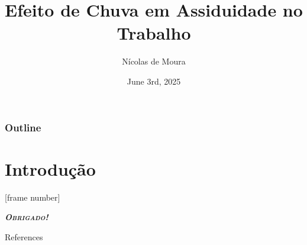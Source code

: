 \documentclass[compress,sans,12pt,aspectratio=169]{beamer}
\title{\textbf{Efeito de Chuva em Assiduidade no Trabalho}}
\date{June 3rd, 2025}
\author{Nícolas de Moura \inst{\textdagger}}
\institute{\inst{\textdagger} Escola de Economia de São Paulo - FGV/EESP}
\newcommand{\textdest}[1]{\textbf{\textit{\textsc{#1}}}}
\begin{document}
\frame[plain]{\titlepage}

    \begin{frame}[plain]
        \frametitle{Outline}
        \tableofcontents
    \end{frame}

    \section{Introdução}
    


\End

[frame number]


\begin{frame}
      \centering\LARGE{\textdest{Obrigado!}}
\end{frame}


\begin{frame}[allowframebreaks]{References}
    
\end{frame}
\end{document}
